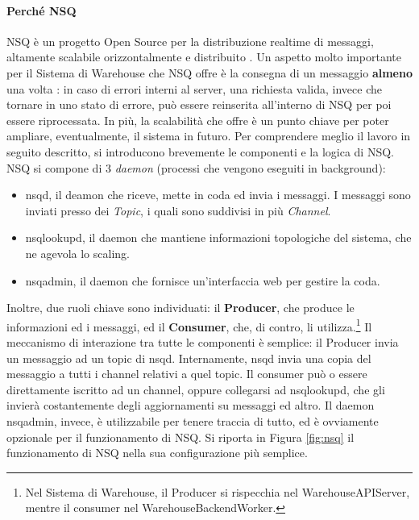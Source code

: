 \paragraph{Perché NSQ} NSQ è un progetto Open Source per la distribuzione realtime di messaggi, altamente scalabile orizzontalmente e distribuito \cite{nsqfeat}. Un aspetto molto importante per il Sistema di Warehouse che NSQ offre è la consegna di un messaggio \textbf{almeno} una volta \cite{nsqfeat}: in caso di errori interni al server, una richiesta valida, invece che tornare in uno stato di errore, può essere reinserita all'interno di NSQ per poi essere riprocessata. In più, la scalabilità che offre è un punto chiave per poter ampliare, eventualmente, il sistema in futuro. Per comprendere meglio il lavoro in seguito descritto, si introducono brevemente le componenti e la logica di NSQ. NSQ si compone di 3 \textit{daemon} (processi che vengono eseguiti in background): 
\begin{itemize}
    \item nsqd, il deamon che riceve, mette in coda ed invia i messaggi. I messaggi sono inviati presso dei \textit{Topic}, i quali sono suddivisi in più \textit{Channel}.
    \item nsqlookupd, il daemon che mantiene informazioni topologiche del sistema, che ne agevola lo scaling. 
    \item nsqadmin, il daemon che fornisce un'interfaccia web per gestire la coda.
\end{itemize}
Inoltre, due ruoli chiave sono individuati: il \textbf{Producer}, che produce le informazioni ed i messaggi, ed il \textbf{Consumer}, che, di contro, li utilizza.\footnote{Nel Sistema di Warehouse, il Producer si rispecchia nel WarehouseAPIServer, mentre il consumer nel WarehouseBackendWorker.} Il meccanismo di interazione tra tutte le componenti è semplice: il Producer invia un messaggio ad un topic di nsqd. Internamente, nsqd invia una copia del messaggio a tutti i channel relativi a quel topic. Il consumer può o essere direttamente iscritto ad un channel, oppure collegarsi ad nsqlookupd, che gli invierà costantemente degli aggiornamenti su messaggi ed altro. Il daemon nsqadmin, invece, è utilizzabile per tenere traccia di tutto, ed è ovviamente opzionale per il funzionamento di NSQ. Si riporta in Figura \ref{fig:nsq} il funzionamento di NSQ nella sua configurazione più semplice.
